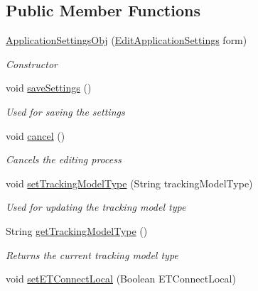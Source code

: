 \subsection*{Public Member Functions}
\begin{DoxyCompactItemize}
\item 
\hyperlink{class_web_analyzer_1_1_u_i_1_1_interaction_objects_1_1_application_settings_obj_a0642bb10f6b638fd83af16a36717a1b4}{Application\+Settings\+Obj} (\hyperlink{class_web_analyzer_1_1_u_i_1_1_edit_application_settings}{Edit\+Application\+Settings} form)
\begin{DoxyCompactList}\small\item\em Constructor \end{DoxyCompactList}\item 
void \hyperlink{class_web_analyzer_1_1_u_i_1_1_interaction_objects_1_1_application_settings_obj_a25bfafaa8c9da56aaba285bf38fe95c5}{save\+Settings} ()
\begin{DoxyCompactList}\small\item\em Used for saving the settings \end{DoxyCompactList}\item 
void \hyperlink{class_web_analyzer_1_1_u_i_1_1_interaction_objects_1_1_application_settings_obj_a9f4f000c4545b78f94da12994b3b4941}{cancel} ()
\begin{DoxyCompactList}\small\item\em Cancels the editing process \end{DoxyCompactList}\item 
void \hyperlink{class_web_analyzer_1_1_u_i_1_1_interaction_objects_1_1_application_settings_obj_a8a8288c3aeb62515e406be67134c46c5}{set\+Tracking\+Model\+Type} (String tracking\+Model\+Type)
\begin{DoxyCompactList}\small\item\em Used for updating the tracking model type \end{DoxyCompactList}\item 
String \hyperlink{class_web_analyzer_1_1_u_i_1_1_interaction_objects_1_1_application_settings_obj_a618827de749cb08f92eb69b0edb95636}{get\+Tracking\+Model\+Type} ()
\begin{DoxyCompactList}\small\item\em Returns the current tracking model type \end{DoxyCompactList}\item 
void \hyperlink{class_web_analyzer_1_1_u_i_1_1_interaction_objects_1_1_application_settings_obj_a474bee15839a7865a1af2803a7755f80}{set\+E\+T\+Connect\+Local} (Boolean E\+T\+Connect\+Local)

\end{DoxyCompactItemize}
